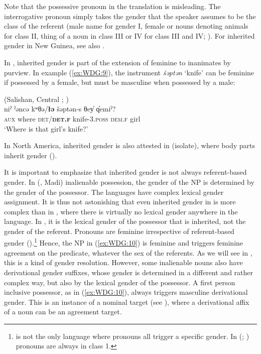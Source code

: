 \documentclass[output=collectionpaper]{langsci/langscibook}
\begin{document}
Note that the possessive pronoun in the  translation is misleading. The interrogative pronoun simply takes the gender that the speaker assumes to be the class of the referent (male name for gender I, female or nouns denoting animals for class II, thing of a noun in class III or IV for class III and IV; \citealt[187--188]{Olsson2017}). For inherited gender in New Guinea, see also \cite[177]{Fedden2011}.

In , inherited gender is part of the extension of feminine to inanimates by purview. In example (\ref{ex:WDG:9}), the instrument \textit{šəptən} `knife' can be feminine if possessed by a female, but must be masculine when possessed by a male:

\ea\label{ex:WDG:9}
 (Salishan, Central ; \citealt{Gerdts2013})\\
\gll niˀ	ˀəncə	kʷθə/\textbf{łə}	šəptən-s	θey̓	q̓emiˀ?\\
\textsc{aux}	where	\textsc{det}/\textbf{\textsc{det.f}}	knife-3.\textsc{poss}	\textsc{dem.f}	girl\\
\glt `Where is that girl's knife?'\\
\z

In North America, inherited gender is also attested in  (isolate), where body parts inherit gender (\citealt[23]{Swanton1921}).

It is important to emphasize that inherited gender is not always referent-based gender. In  (, Madi) inalienable possession, the gender of the NP is determined by the gender of the possessor. The  languages have complex lexical gender assignment. It is thus not astonishing that even inherited gender in  is more complex than in , where there is virtually no lexical gender anywhere in the language. In , it is the lexical gender of the possessor that is inherited, not the gender of the referent. Pronouns are feminine irrespective of referent-based gender (\citealt[489]{Dixon2000}).\footnote{%
 is not the only language where pronouns all trigger a specific gender. In  (; ) pronouns are always in class 1.
} %
Hence, the NP in (\ref{ex:WDG:10}) is feminine and triggers feminine agreement on the predicate, whatever the sex of the referents. As we will see in , this is a kind of gender resolution. However, some inalienable nouns also have derivational gender suffixes, whose gender is determined in a different and rather complex way, but also by the lexical gender of the possessor. A first person inclusive possessor, as in (\ref{ex:WDG:10}), always triggers masculine derivational gender. This is an instance of a nominal target (see ), where a derivational affix of a noun can be an agreement target.
\end{document}
